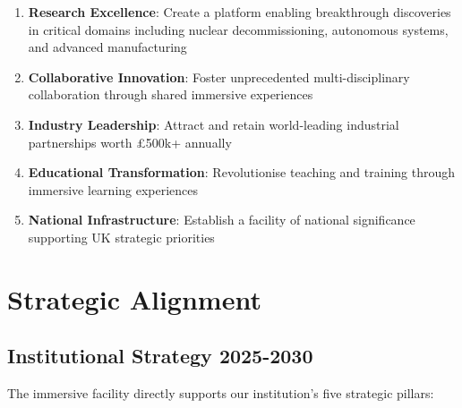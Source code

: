 \begin{enumerate}
    \item \textbf{Research Excellence}: Create a platform enabling breakthrough discoveries in critical domains including nuclear decommissioning, autonomous systems, and advanced manufacturing

    \item \textbf{Collaborative Innovation}: Foster unprecedented multi-disciplinary collaboration through shared immersive experiences

    \item \textbf{Industry Leadership}: Attract and retain world-leading industrial partnerships worth £500k+ annually

    \item \textbf{Educational Transformation}: Revolutionise teaching and training through immersive learning experiences

    \item \textbf{National Infrastructure}: Establish a facility of national significance supporting UK strategic priorities
\end{enumerate}

\section{Strategic Alignment}

\subsection{Institutional Strategy 2025-2030}

The immersive facility directly supports our institution's five strategic pillars:

